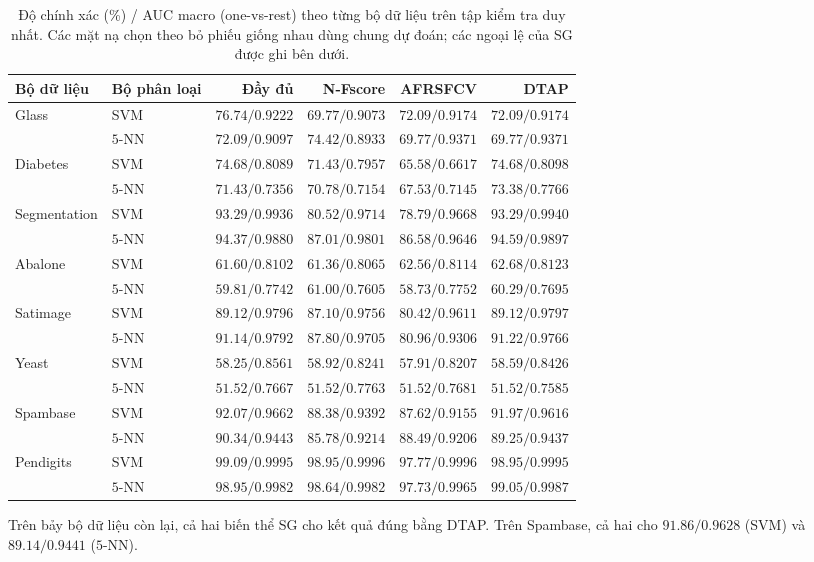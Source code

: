 \begin{table}[htbp]
\centering\small\setlength{\tabcolsep}{4pt}
\caption{Độ chính xác (\%) / AUC macro (one-vs-rest) theo từng bộ dữ liệu trên tập kiểm tra duy nhất. Các mặt nạ chọn theo bỏ phiếu giống nhau dùng chung dự đoán; các ngoại lệ của SG được ghi bên dưới.}\label{tab:acc}
\begin{tabular}{llrrrr}
\toprule
Bộ dữ liệu & Bộ phân loại & Đầy đủ & N-Fscore & AFRSFCV & DTAP \\
\midrule
Glass & SVM & $76.74/0.9222$ & $69.77/0.9073$ & $72.09/0.9174$ & $72.09/0.9174$ \\
 & $5$-NN & $72.09/0.9097$ & $74.42/0.8933$ & $69.77/0.9371$ & $69.77/0.9371$ \\
Diabetes & SVM & $74.68/0.8089$ & $71.43/0.7957$ & $65.58/0.6617$ & $74.68/0.8098$ \\
 & $5$-NN & $71.43/0.7356$ & $70.78/0.7154$ & $67.53/0.7145$ & $73.38/0.7766$ \\
Segmentation & SVM & $93.29/0.9936$ & $80.52/0.9714$ & $78.79/0.9668$ & $93.29/0.9940$ \\
 & $5$-NN & $94.37/0.9880$ & $87.01/0.9801$ & $86.58/0.9646$ & $94.59/0.9897$ \\
Abalone & SVM & $61.60/0.8102$ & $61.36/0.8065$ & $62.56/0.8114$ & $62.68/0.8123$ \\
 & $5$-NN & $59.81/0.7742$ & $61.00/0.7605$ & $58.73/0.7752$ & $60.29/0.7695$ \\
Satimage & SVM & $89.12/0.9796$ & $87.10/0.9756$ & $80.42/0.9611$ & $89.12/0.9797$ \\
 & $5$-NN & $91.14/0.9792$ & $87.80/0.9705$ & $80.96/0.9306$ & $91.22/0.9766$ \\
Yeast & SVM & $58.25/0.8561$ & $58.92/0.8241$ & $57.91/0.8207$ & $58.59/0.8426$ \\
 & $5$-NN & $51.52/0.7667$ & $51.52/0.7763$ & $51.52/0.7681$ & $51.52/0.7585$ \\
Spambase & SVM & $92.07/0.9662$ & $88.38/0.9392$ & $87.62/0.9155$ & $91.97/0.9616$ \\
 & $5$-NN & $90.34/0.9443$ & $85.78/0.9214$ & $88.49/0.9206$ & $89.25/0.9437$ \\
Pendigits & SVM & $99.09/0.9995$ & $98.95/0.9996$ & $97.77/0.9996$ & $98.95/0.9995$ \\
 & $5$-NN & $98.95/0.9982$ & $98.64/0.9982$ & $97.73/0.9965$ & $99.05/0.9987$ \\
\bottomrule
\end{tabular}
\par\smallskip\begin{minipage}{0.97\textwidth}\footnotesize Trên bảy bộ dữ liệu còn lại, cả hai biến thể SG cho kết quả đúng bằng DTAP. Trên Spambase, cả hai cho $91.86/0.9628$ (SVM) và $89.14/0.9441$ ($5$-NN). \end{minipage}
\end{table}
